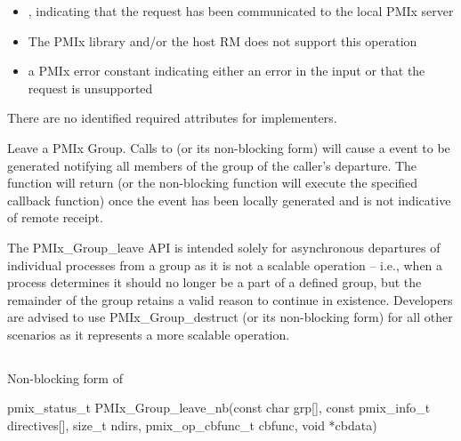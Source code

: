 \begin{itemize}
    \item {}, indicating that the request has been communicated to the local \ac{PMIx} server
    \item {} The \ac{PMIx} library and/or the host \ac{RM} does not support this operation
    \item a \ac{PMIx} error constant indicating either an error in the input or that the request is unsupported
\end{itemize}

\reqattrstart
There are no identified required attributes for implementers.
\reqattrend


\descr

Leave a PMIx Group. Calls to  (or its non-blocking form) will cause a  event to be generated notifying all members of the group of the caller’s departure. The function will return (or the non-blocking function will execute the specified callback function) once the event has been locally generated and is not indicative of remote receipt.

\adviceuserstart
The PMIx_Group_leave API is intended solely for asynchronous departures of individual processes from a group as it is not a scalable operation – i.e., when a process determines it should no longer be a part of a defined group, but the remainder of the group retains a valid reason to continue in existence. Developers are advised to use PMIx_Group_destruct (or its non-blocking form) for all other scenarios as it represents a more scalable operation.
\adviceuserend

\subsection{}

\summary

Non-blocking form of 

\format

\cspecificstart
\begin{codepar}
pmix_status_t
PMIx_Group_leave_nb(const char grp[],
                    const pmix_info_t directives[], size_t ndirs,
                    pmix_op_cbfunc_t cbfunc, void *cbdata)
\end{codepar}
\cspecificend

